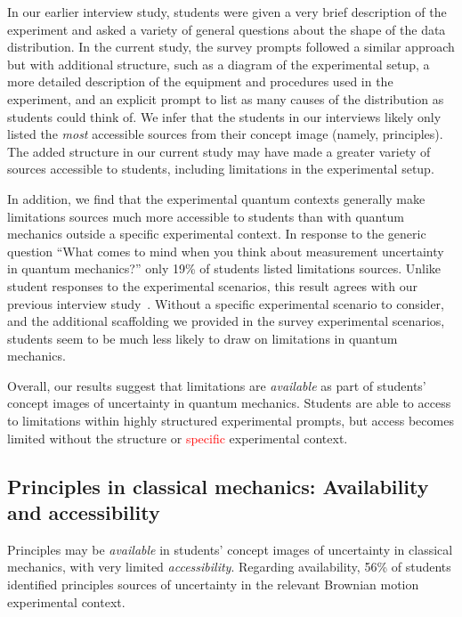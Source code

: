 \documentclass[english,aps,prstper,reprint,showpacs,longbibliography,superscriptaddress,nofootinbib]{revtex4-2}
\begin{document}
In our earlier interview study, students were given a very brief description of the experiment and asked a variety of general questions about the shape of the data distribution. In the current study, the survey prompts followed a similar approach but with additional structure, such as a diagram of the experimental setup, a more detailed description of the equipment and procedures used in the experiment, and an explicit prompt to list as many causes of the distribution as students could think of. We infer that the students in our interviews likely only listed the \emph{most} accessible sources from their concept image (namely, principles). The added structure in our current study may have made a greater variety of sources accessible to students, including limitations in the experimental setup.

In addition, we find that the experimental quantum contexts generally make limitations sources much more accessible to students than with quantum mechanics outside a specific experimental context. In response to the generic question ``What comes to mind when you think about measurement uncertainty in quantum mechanics?'' only 19\% of students listed limitations sources. Unlike student responses to the experimental scenarios, this result agrees with our previous interview study~\cite{Stein2019,Stump2020}.
Without a specific experimental scenario to consider, and the additional scaffolding we provided in the survey experimental scenarios, students seem to be much less likely to draw on limitations in quantum mechanics.

Overall, our results suggest that limitations are \emph{available} as part of students' concept images of uncertainty in quantum mechanics. Students are able to access to limitations within highly structured experimental prompts, but access becomes limited without the structure or \textcolor{red}{specific} experimental context.

\subsection{Principles in classical mechanics: Availability and accessibility}

Principles may be \emph{available} in students' concept images of uncertainty in classical mechanics, with very limited \emph{accessibility}. Regarding availability, 56\% of students identified principles sources of uncertainty in the relevant Brownian motion experimental context.
\end{document}
